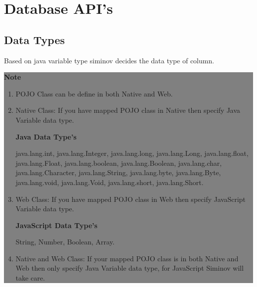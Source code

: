 \newpage
\chapter {\Large{Database API's}}


\section{Data Types}
Based on java variable type siminov decides the data type of column.


					\begin{center}
						\colorbox{grey}{
						\parbox[t]{.8\linewidth}{
							\fontsize{11pt}{11pt}\selectfont %
							\vspace*{0.1cm} %
		
							\hfill \textbf{Note} \\
		
												\begin{enumerate}
		
					\item \small POJO Class can be define in both Native and Web.

					\item \small Native Class: If you have mapped POJO class in Native then specify Java Variable data type.

					\textbf{Java Data Type's}
						\par
						java.lang.int, java.lang.Integer, java.lang.long, java.lang.Long, java.lang.float, java.lang.Float, java.lang.boolean, java.lang.Boolean, java.lang.char, java.lang.Character, java.lang.String, java.lang.byte, java.lang.Byte, java.lang.void, java.lang.Void, java.lang.short, java.lang.Short.

				
					\item \small Web Class: If you have mapped POJO class in Web then specify JavaScript Variable data type.

					\textbf{JavaScript Data Type's}
						\par
						String, Number, Boolean, Array.
	

					\item \small Native and Web Class: If your mapped POJO class is in both Native and Web then only specify Java Variable data type, for JavaScript Siminov will take care.


				\end{enumerate}




							\vspace*{0.0cm} %
						}
					}

					\end{center}



